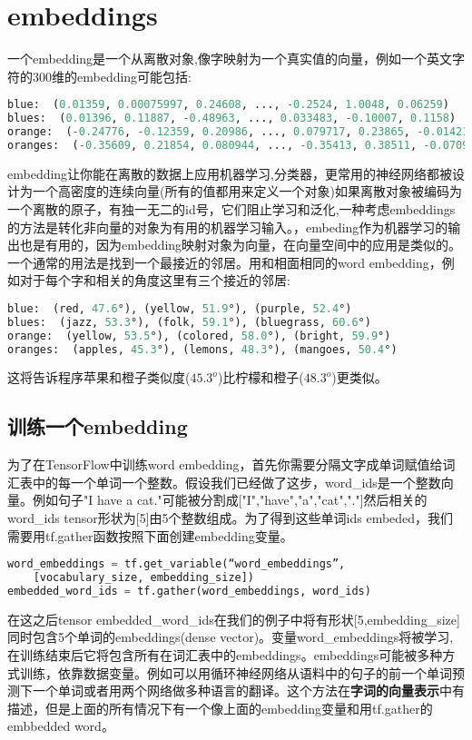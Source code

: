 \section{embeddings}
一个embedding是一个从离散对象,像字映射为一个真实值的向量，例如一个英文字符的300维的embedding可能包括:
\begin{lstlisting}[language=Python]
blue:  (0.01359, 0.00075997, 0.24608, ..., -0.2524, 1.0048, 0.06259)
blues:  (0.01396, 0.11887, -0.48963, ..., 0.033483, -0.10007, 0.1158)
orange:  (-0.24776, -0.12359, 0.20986, ..., 0.079717, 0.23865, -0.014213)
oranges:  (-0.35609, 0.21854, 0.080944, ..., -0.35413, 0.38511, -0.070976)
\end{lstlisting}
embedding让你能在离散的数据上应用机器学习,分类器，更常用的神经网络都被设计为一个高密度的连续向量(所有的值都用来定义一个对象)如果离散对象被编码为一个离散的原子，有独一无二的id号，它们阻止学习和泛化,一种考虑embeddings的方法是转化非向量的对象为有用的机器学习输入。，embeding作为机器学习的输出也是有用的，因为embedding映射对象为向量，在向量空间中的应用是类似的。一个通常的用法是找到一个最接近的邻居。用和相面相同的word embedding，例如对于每个字和相关的角度这里有三个接近的邻居:
\begin{lstlisting}[language=Python]
blue:  (red, 47.6°), (yellow, 51.9°), (purple, 52.4°)
blues:  (jazz, 53.3°), (folk, 59.1°), (bluegrass, 60.6°)
orange:  (yellow, 53.5°), (colored, 58.0°), (bright, 59.9°)
oranges:  (apples, 45.3°), (lemons, 48.3°), (mangoes, 50.4°)
\end{lstlisting}
这将告诉程序苹果和橙子类似度($45.3^o$)比柠檬和橙子($48.3^o$)更类似。
\subsection{训练一个embedding}
为了在TensorFlow中训练word embedding，首先你需要分隔文字成单词赋值给词汇表中的每一个单词一个整数。假设我们已经做了这步，word\_ids是一个整数向量。例如句子"I have a cat."可能被分割成["I","have","a","cat","."]然后相关的word\_ids tensor形状为[5]由5个整数组成。为了得到这些单词ids embeded，我们需要用tf.gather函数按照下面创建embedding变量。
\begin{lstlisting}[language=Python]
word_embeddings = tf.get_variable(“word_embeddings”,
    [vocabulary_size, embedding_size])
embedded_word_ids = tf.gather(word_embeddings, word_ids)
\end{lstlisting}
在这之后tensor embedded\_word\_ids在我们的例子中将有形状[5,embedding\_size]同时包含5个单词的embeddings(dense vector)。变量word\_embeddings将被学习,在训练结束后它将包含所有在词汇表中的embeddings。embeddings可能被多种方式训练，依靠数据变量。例如可以用循环神经网络从语料中的句子的前一个单词预测下一个单词或者用两个网络做多种语言的翻译。这个方法在\textbf{字词的向量表示}中有描述，但是上面的所有情况下有一个像上面的embedding变量和用tf.gather的embbedded word。
